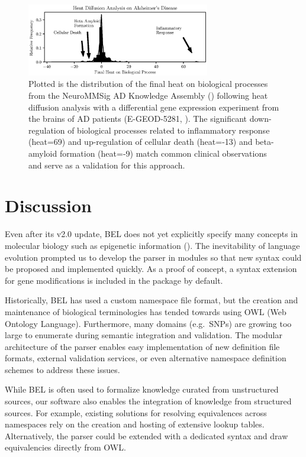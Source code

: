 \documentclass{bioinfo}
\begin{document}
\begin{figure}[!tpb]%
\includegraphics[width=8cm]{figure1.eps}
\caption{Plotted is the distribution of the final heat on biological processes from the NeuroMMSig AD Knowledge Assembly (\citealp{Domingo-Fernandez2017}) following heat diffusion analysis with a differential gene expression experiment from the brains of AD patients (E-GEOD-5281, \citealp{Liang2007}). The significant down-regulation of biological processes related to inflammatory response (heat=69) and up-regulation of cellular death (heat=-13) and beta-amyloid formation (heat=-9) match common clinical observations and serve as a validation for this approach.}\label{fig:01}
\end{figure}

\section{Discussion}

Even after its v2.0 update, BEL does not yet explicitly specify many concepts in molecular biology such as epigenetic information (\citealp{Irin2015}). The inevitability of language evolution prompted us to develop the parser in modules so that new syntax could be proposed and implemented quickly. As a proof of concept, a syntax extension for gene modifications is included in the package by default.

Historically, BEL has used a custom namespace file format, but the creation and maintenance of biological terminologies has tended towards using OWL (Web Ontology Language). Furthermore, many domains (e.g.\ SNPs) are growing too large to enumerate during semantic integration and validation. The modular architecture of the parser enables easy implementation of new definition file formats, external validation services, or even alternative namespace definition schemes to address these issues.

While BEL is often used to formalize knowledge curated from unstructured sources, our software also enables the integration of knowledge from structured sources. For example, existing solutions for resolving equivalences across namespaces rely on the creation and hosting of extensive lookup tables. Alternatively, the parser could be extended with a dedicated syntax and draw equivalencies directly from OWL.
\end{document}
